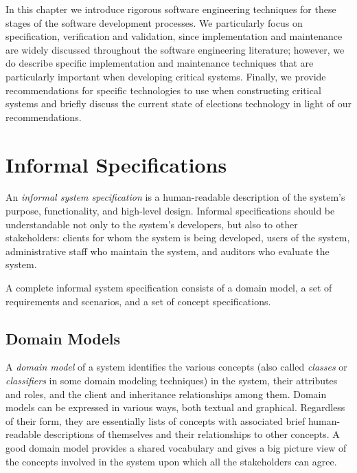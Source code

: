In this chapter we introduce rigorous software engineering techniques
for these stages of the software development processes. We
particularly focus on specification, verification and validation,
since implementation and maintenance are widely discussed throughout
the software engineering literature; however, we do describe specific
implementation and maintenance techniques that are particularly
important when developing critical systems. Finally, we provide
recommendations for specific technologies to use when constructing
critical systems and briefly discuss the current state of elections
technology in light of our recommendations.


\section{Informal Specifications}

An \emph{informal system specification} is a human-readable
description of the system's purpose, functionality, and high-level
design. Informal specifications should be understandable not only to
the system's developers, but also to other stakeholders: clients for
whom the system is being developed, users of the system,
administrative staff who maintain the system, and auditors who
evaluate the system.

A complete informal system specification consists of a domain model, a
set of requirements and scenarios, and a set of concept
specifications.

\subsection{Domain Models}

A \emph{domain model} of a system identifies the various concepts
(also called \emph{classes} or \emph{classifiers} in some domain
modeling techniques) in the system, their attributes and roles, and
the client and inheritance relationships among them. Domain models can
be expressed in various ways, both textual and graphical. Regardless
of their form, they are essentially lists of concepts with associated
brief human-readable descriptions of themselves and their
relationships to other concepts. A good domain model provides a shared
vocabulary and gives a big picture view of the concepts involved in
the system upon which all the stakeholders can agree.

